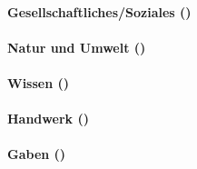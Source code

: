 \paragraph{Gesellschaftliches/Soziales (\SP[16])}

\paragraph{Natur und Umwelt (\SP[16])}

\paragraph{Wissen (\SP[28])}

\paragraph{Handwerk (\SP[28])}

\paragraph{Gaben (\SP[16])}